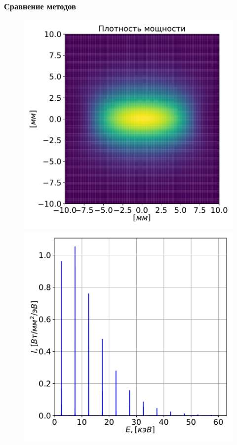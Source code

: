\documentclass[14pt, hyperref = {colorlinks},xcolor=table ]{beamer}
\begin{document}
\small
\begin{frame}
\frametitle{Сравнение методов}\label{t1}
\vspace{-10pt}
\begin{figure}[h]
	\begin{minipage}[h]{0.49\linewidth}
		\includegraphics[width=0.99\linewidth]{pic/power_dens_1-2_2d.pdf}
	\end{minipage}	
	\begin{minipage}[h]{0.49\linewidth}
		\includegraphics[width=0.99\linewidth]{pic/Spec_1-2.pdf}

\end{minipage}
\end{figure}
\end{frame}
\end{document}
